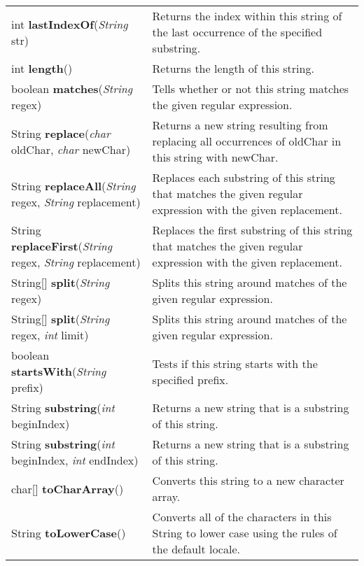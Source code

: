 \documentclass[main]{subfiles}
\begin{document}
\begin{longtable}{p{0.4\linewidth} p{0.6\linewidth}}
int  \textbf{lastIndexOf}(\textit{String} str) 
& Returns the index within this string of the last occurrence of the specified substring.\\

int  \textbf{length}() 
& Returns the length of this string.\\

boolean  \textbf{matches}(\textit{String} regex) 
& Tells whether or not this string matches the given regular expression.\\

String  \textbf{replace}(\textit{char} oldChar, \textit{char} newChar) 
& Returns a new string resulting from replacing all occurrences of oldChar in this string with newChar.\\

String \textbf{replaceAll}(\textit{String} regex, \textit{String} replacement) 
& Replaces each substring of this string that matches the given regular expression with the given replacement.\\

String \textbf{replaceFirst}(\textit{String} regex, \textit{String} replacement) 
& Replaces the first substring of this string that matches the given regular expression with the given replacement.\\

String[]  \textbf{split}(\textit{String} regex) 
& Splits this string around matches of the given regular expression.\\

String[]  \textbf{split}(\textit{String} regex, \textit{int} limit) 
& Splits this string around matches of the given regular expression.\\

boolean  \textbf{startsWith}(\textit{String} prefix) 
& Tests if this string starts with the specified prefix.\\

String  \textbf{substring}(\textit{int} beginIndex) 
& Returns a new string that is a substring of this string.\\

String  \textbf{substring}(\textit{int} beginIndex, \textit{int} endIndex) 
& Returns a new string that is a substring of this string.\\

char[]  \textbf{toCharArray}() 
& Converts this string to a new character array.\\

String  \textbf{toLowerCase}() 
& Converts all of the characters in this String to lower case using the rules of the default locale.\\


\end{longtable}
\end{document}
